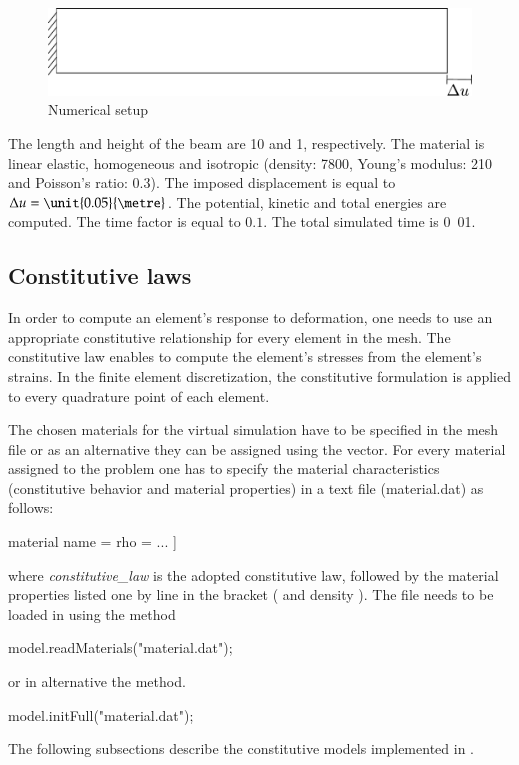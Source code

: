 \begin{figure}[!htb]
  \centering
  \includegraphics[scale=.6]{figures/explicit_dynamic}
  \caption{Numerical setup \label{fig:smm:explicit}}
\end{figure}

The length  and height of  the beam are \unit{10}{\metre}  and \unit{1}{\metre},
respectively.   The  material  is  linear  elastic,  homogeneous  and  isotropic
(density:       \unit{7800}{\kilogrampercubicmetre},       Young's      modulus:
\unit{210}{\giga\pascal} and Poisson's  ratio: $0.3$).  The imposed displacement
is equal to  $\Delta u = \unit{0.05}{\metre}$. The  potential, kinetic and
total  energies are  computed.  The  time factor  is equal  to $0.1$.  The total
simulated time is \unit{0.01}{\second}.

\subsection{Constitutive laws \label{sect:smm:CL}}
In order to compute an element's response to deformation, one needs to use an
appropriate constitutive relationship for every element in the mesh. The
constitutive law enables to compute the element's stresses from the element's
strains. In the finite element discretization, the constitutive formulation is
applied to every quadrature point of each element.

The chosen materials for the virtual simulation have to be specified in the mesh
file or as an alternative they can be assigned using the
 vector.  For every material assigned to the problem one
has to specify the material characteristics (constitutive behavior and material
properties) in a text file (\eg material.dat) as follows:
\begin{cpp}
  material %
  name = %
  rho = %
  ...
  ]
\end{cpp}
 where \emph{constitutive\_law} is the adopted
constitutive law, followed by the material properties listed one by line in the
bracket (\eg {} and density ). The file needs to be loaded in
\akantu using the  method
\begin{cpp}
  model.readMaterials("material.dat");
\end{cpp}
or in alternative the  method.
\begin{cpp}
  model.initFull("material.dat");
\end{cpp}
The following subsections describe the constitutive models implemented in \akantu.

